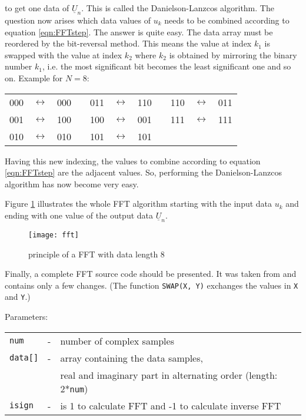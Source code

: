 to get one data of $\underline{U}_n$. This is called the
Danielson-Lanzcos algorithm.
The question now arises which data values of $u_k$
needs to be combined according to equation \ref{eqn:FFTstep}.
The answer is quite easy. The data array must be reordered by the
bit-reversal method. This means the value at index $k_1$ is swapped
with the value at index $k_2$ where $k_2$ is obtained by mirroring
the binary number $k_1$, i.e. the most significant bit becomes the
least significant one and so on. Example for $N=8$:

\begin{tabular}{ccccccccccc}
000 & $\leftrightarrow$ & 000  & \qquad\qquad &  011 & $\leftrightarrow$ & 110  & \qquad\qquad &  110 & $\leftrightarrow$ & 011 \\
001 & $\leftrightarrow$ & 100  & \qquad\qquad &  100 & $\leftrightarrow$ & 001  & \qquad\qquad &  111 & $\leftrightarrow$ & 111 \\
010 & $\leftrightarrow$ & 010  & \qquad\qquad &  101 & $\leftrightarrow$ & 101 \\
\end{tabular}

Having this new indexing, the values to combine according to
equation \ref{eqn:FFTstep} are the adjacent values. So, performing
the Danielson-Lanzcos algorithm has now become very easy.

\addvspace{12pt}

Figure \ref{fig:fft} illustrates the whole FFT algorithm starting with the
input data $u_k$ and ending with one value of the output data
$\underline{U}_n$.

\begin{figure}[htb]
\begin{center}
\texttt{[image: fft]}
\end{center}
\caption{principle of a FFT with data length 8}
\label{fig:fft}
\end{figure}
\FloatBarrier

Finally, a complete FFT source code should be presented. It was taken
from \cite{Press} and contains only a
few changes. (The function \texttt{SWAP(X, Y)} exchanges the values in
\texttt{X} and \texttt{Y}.)

\addvspace{12pt}

Parameters:\\
\begin{tabular}{lcl}
\texttt{num}    & - & number of complex samples\\
\texttt{data[]} & - & array containing the data samples,\\
                &   & real and imaginary part in alternating order (length: 2*\texttt{num})\\
\texttt{isign}  & - & is 1 to calculate FFT and -1 to calculate inverse FFT
\end{tabular}


